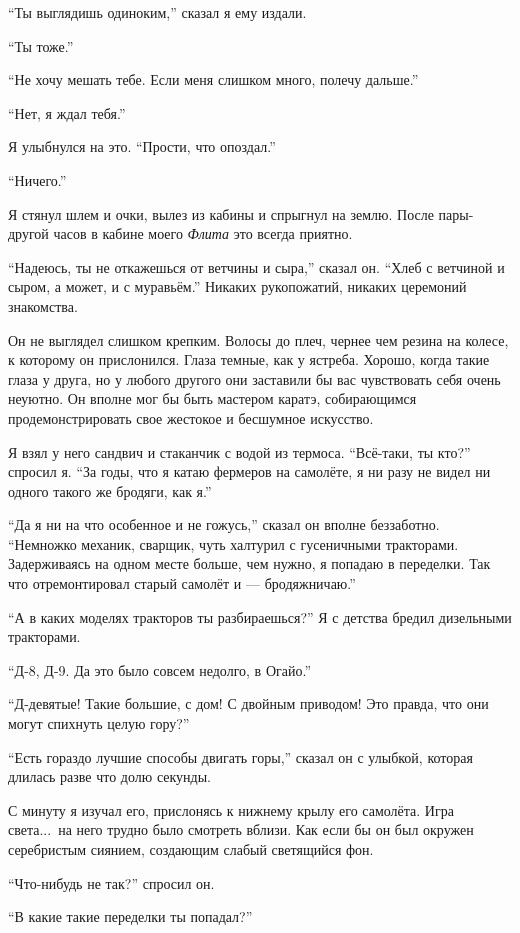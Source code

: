 ``Ты выглядишь одиноким,'' сказал я ему издали.

``Ты тоже.''

``Не хочу мешать тебе. Если меня слишком много, полечу дальше.''

``Нет, я ждал тебя.''

Я улыбнулся на это. ``Прости, что опоздал.''

``Ничего.''

Я стянул шлем и очки, вылез из кабины и спрыгнул на землю. После пары-другой часов в кабине моего
{\it Флита\/} это всегда приятно.

``Надеюсь, ты не откажешься от ветчины и сыра,'' сказал он. ``Хлеб с ветчиной и сыром, а может, и с муравьём.''
Никаких рукопожатий, никаких церемоний знакомства.

Он не выглядел слишком крепким. Волосы до плеч, чернее чем резина на колесе, к которому он прислонился. Глаза темные, как у ястреба. Хорошо, когда такие глаза у друга, но у любого другого они заставили бы вас чувствовать себя очень неуютно. Он вполне мог бы быть мастером каратэ, собирающимся продемонстрировать свое жестокое и бесшумное искусство.

Я взял у него сандвич и стаканчик с водой из термоса.
``Всё-таки, ты кто?'' спросил я. ``За годы, что я катаю фермеров на самолёте, я ни разу не видел ни одного такого же бродяги, как я.''

``Да я ни на что особенное и не гожусь,'' сказал он вполне беззаботно. ``Немножко механик, сварщик, чуть халтурил с гусеничными тракторами. Задерживаясь на одном месте больше, чем нужно, я попадаю в переделки. Так что отремонтировал старый самолёт и --- бродяжничаю.''

``А в каких моделях тракторов ты разбираешься?'' Я с детства бредил дизельными тракторами.

``Д-8, Д-9. Да это было совсем недолго, в Огайо.''

``Д-девятые! Такие большие, с дом! С двойным приводом! Это правда, что они могут спихнуть целую гору?''

``Есть гораздо лучшие способы двигать горы,'' сказал он с улыбкой, которая длилась разве что долю секунды.

С минуту я изучал его, прислонясь к нижнему крылу его самолёта. Игра света...\ на него трудно было смотреть вблизи. Как если бы он был окружен серебристым сиянием, создающим слабый светящийся фон.

``Что-нибудь не так?'' спросил он.

``В какие такие переделки ты попадал?''

